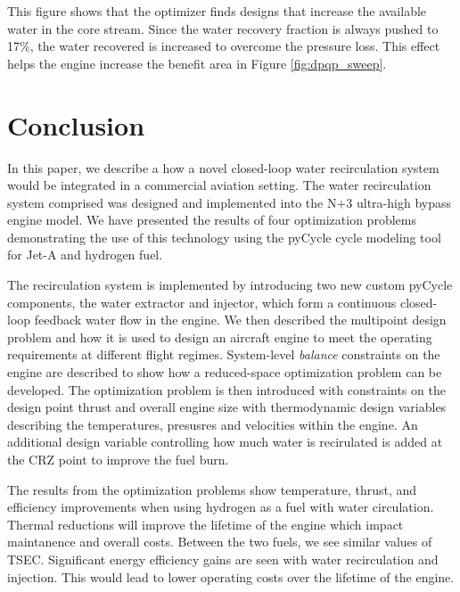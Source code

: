 \documentclass[conf]{new-aiaa}
\begin{document}
This figure shows that the optimizer finds designs that increase the available water in the core stream.
Since the water recovery fraction is always pushed to 17\%, the water recovered is increased to overcome the pressure loss.
This effect helps the engine increase the benefit area in Figure \ref{fig:dpqp_sweep}.


\section{Conclusion}
\label{sec:conc}
In this paper, we describe a how a novel closed-loop water recirculation system would be integrated in a commercial aviation setting.
The water recirculation system comprised was designed and implemented into the N+3 ultra-high bypass engine model.
We have presented the results of four optimization problems demonstrating the use of this technology using the pyCycle cycle modeling tool for Jet-A and hydrogen fuel.

The recirculation system is implemented by introducing two new custom pyCycle components, the water extractor and injector, which form a continuous closed-loop feedback water flow in the engine.
We then described the multipoint design problem and how it is used to design an aircraft engine to meet the operating requirements at different flight regimes.
System-level \emph{balance} constraints on the engine are described to show how a reduced-space optimization problem can be developed.
The optimization problem is then introduced with constraints on the design point thrust and overall engine size with thermodynamic design variables describing the temperatures, presusres and velocities within the engine.
An additional design variable controlling how much water is recirulated is added at the CRZ point to improve the fuel burn.

The results from the optimization problems show temperature, thrust, and efficiency improvements when using hydrogen as a fuel with water circulation.
Thermal reductions will improve the lifetime of the engine which impact maintanence and overall costs.
Between the two fuels, we see similar values of TSEC.
Significant energy efficiency gains are seen with water recirculation and injection.
This would lead to lower operating costs over the lifetime of the engine.
\end{document}

